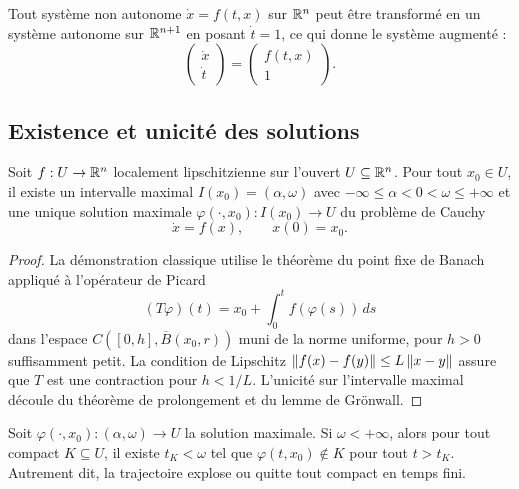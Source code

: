 \begin{remarque}
Tout syst\`eme non autonome $\dot{x} = f(t,x)$ sur $\mathbb{R}^n$ peut \^etre
transform\'e en un syst\`eme autonome sur $\mathbb{R}^{n+1}$ en posant
$\dot{t} = 1$, ce qui donne le syst\`eme augment\'e :
\[
    \begin{pmatrix} \dot{x} \\ \dot{t} \end{pmatrix} =
    \begin{pmatrix} f(t,x) \\ 1 \end{pmatrix}.
\]
\end{remarque}

\subsection{Existence et unicit\'e des solutions}

\begin{theoreme}
\label{thm:cauchy-lipschitz}
Soit $f : U \to \mathbb{R}^n$ localement lipschitzienne sur l'ouvert $U \subseteq \mathbb{R}^n$.
Pour tout $x_0 \in U$, il existe un intervalle maximal $I(x_0) = (\alpha, \omega)$
avec $-\infty \leq \alpha < 0 < \omega \leq +\infty$ et une unique solution
maximale $\varphi(\cdot, x_0) : I(x_0) \to U$ du probl\`eme de Cauchy
\[
    \dot{x} = f(x), \qquad x(0) = x_0.
\]
\end{theoreme}

\begin{proof}
La d\'emonstration classique utilise le th\'eor\`eme du point fixe de Banach
appliqu\'e \`a l'op\'erateur de Picard
\[
    (T\varphi)(t) = x_0 + \int_0^t f(\varphi(s))\, ds
\]
dans l'espace $C([0,h], \overline{B}(x_0, r))$ muni de la norme uniforme,
pour $h > 0$ suffisamment petit. La condition de Lipschitz
$\left\| f(x) - f(y) \right\| \leq L\left\| x - y \right\|$ assure que $T$ est une contraction
pour $h < 1/L$. L'unicit\'e sur l'intervalle maximal d\'ecoule du th\'eor\`eme
de prolongement et du lemme de Gr\"onwall.
\end{proof}

\begin{theoreme}
\label{thm:explosion}
Soit $\varphi(\cdot, x_0) : (\alpha, \omega) \to U$ la solution maximale.
Si $\omega < +\infty$, alors pour tout compact $K \subseteq U$, il existe
$t_K < \omega$ tel que $\varphi(t, x_0) \notin K$ pour tout $t > t_K$.
Autrement dit, la trajectoire \og explose \fg ou quitte tout compact en
temps fini.
\end{theoreme}

